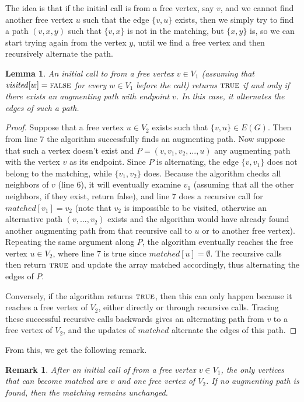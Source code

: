 \documentclass[12pt]{report}
\newtheorem{llemma}[base]{Lemma}
\newtheorem{rremark}[base]{Remark}
\numberwithin{algorithm}{chapter}
\newcommand{\True}{\textsc{true}}
\newcommand{\False}{\textsc{false}}
\begin{document}
	The idea is that if the initial call is from a free vertex, say $v$, and we cannot find another free vertex $u$ such that the edge $\{v, u\}$ exists, then we simply try to find a path $(v,x,y)$ such that $\{v,x\}$ is not in the matching, but $\{x, y\}$ is, so we can start trying again from the vertex $y$, until we find a free vertex and then recursively alternate the path. 
	
	\begin{llemma} \label{callaugmdfs}
		An initial call to  from a free vertex $v \in V_{1}$ (assuming that $\mathit{visited}[w] = \False$ for every $w \in V_{1}$ before the call) returns $\True$ if and only if there exists an augmenting path with endpoint $v$. In this case, it alternates the edges of such a path.
	\end{llemma}
	
	\begin{proof}
		Suppose that a free vertex $u \in V_{2}$ exists such that $\{v,u\} \in E(G)$. Then from line $7$ the algorithm successfully finds an augmenting path. Now suppose that such a vertex doesn't exist and $P=(v,v_{1},v_{2},...,u)$ any augmenting path with the vertex $v$ as its endpoint. Since $P$ is alternating, the edge $\{v, v_{1}\}$ does not belong to the matching, while $\{v_{1}, v_{2}\}$ does. Because the algorithm checks all neighbors of $v$ (line $6$), it will eventually examine $v_{1}$ (assuming that all the other neighbors, if they exist, return false), and line $7$ does a recursive call for $\mathit{matched[v_{1}]} = v_{2}$ (note that $v_{2}$ is impossible to be visited, otherwise an alternative path $(v,...,v_{2})$ exists and the algorithm would have already found another augmenting path from that recursive call to $u$ or to another free vertex). Repeating the same argument along $P$, the algorithm eventually reaches the free vertex $u \in V_{2}$, where line $7$ is true since $\mathit{matched[u]} = \emptyset$. The recursive calls then return $\True$ and update the array matched accordingly, thus alternating the edges of $P$.
		
		Conversely, if the algorithm returns $\True$, then this can only happen because it reaches a free vertex of $V_{2}$, either directly or through recursive calls. Tracing these successful recursive calls backwards gives an alternating path from $v$ to a free vertex of $V_{2}$, and the updates of $\mathit{matched}$ alternate the edges of this path.
	\end{proof}

	From this, we get the following remark.
	\begin{rremark} \label{remarkaugm}
   	 	After an initial call of  from a free vertex $v \in V_{1}$, the only vertices that can become matched are $v$ and one free vertex of $V_{2}$. If no augmenting path is found, then the matching remains unchanged.
	\end{rremark}
\end{document}
